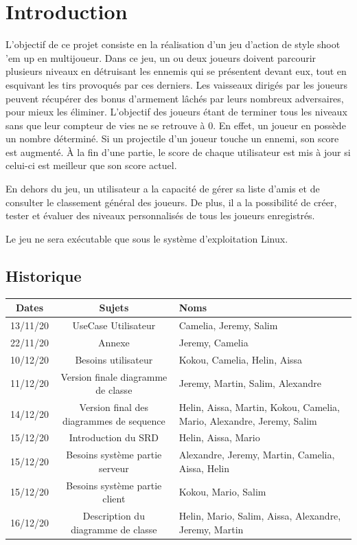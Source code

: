\documentclass[a4paper,12pt]{article}
\begin{document}
\newpage

\tableofcontents

\newpage


\section{Introduction}

L’objectif de ce projet consiste en la réalisation d'un jeu d'action de style shoot 'em up en multijoueur. Dans ce jeu, un ou deux joueurs doivent parcourir plusieurs niveaux en détruisant les ennemis qui se présentent devant eux, tout en esquivant les tirs provoqués par ces derniers. Les vaisseaux dirigés par les joueurs peuvent récupérer des bonus d’armement lâchés par leurs nombreux adversaires, pour mieux les éliminer. L'objectif des joueurs étant de terminer tous les niveaux sans que leur compteur de vies ne se retrouve à 0. En effet, un joueur en possède un nombre déterminé. Si un projectile d'un joueur touche un ennemi, son score est augmenté. À la fin d'une partie, le score de chaque utilisateur est mis à jour si celui-ci est meilleur que son score actuel.

En dehors du jeu, un utilisateur a la capacité de gérer sa liste d'amis et de consulter le classement général des joueurs. De plus, il a la possibilité de créer, tester et évaluer des niveaux personnalisés de tous les joueurs enregistrés.

Le jeu ne sera exécutable que sous le système d'exploitation Linux.

\subsection{Historique}
\begin{tabularx}{15cm}{|c|c|X|}
	\hline
		Dates & Sujets & Noms \\
	\hline
		13/11/20 & UseCase Utilisateur & Camelia, Jeremy, Salim \\
	\hline
		22/11/20 & Annexe & Jeremy, Camelia \\
	\hline
		10/12/20 & Besoins utilisateur & Kokou, Camelia, Helin, Aissa\\
	\hline
		11/12/20 & Version finale diagramme de classe  & Jeremy, Martin, Salim, Alexandre\\
	\hline
		14/12/20 & Version final des diagrammes de sequence & Helin, Aissa, Martin, Kokou, Camelia, 
		Mario, Alexandre, Jeremy, Salim\\
	\hline
		15/12/20 & Introduction du SRD & Helin, Aissa, Mario\\
	\hline
		15/12/20 & Besoins système partie serveur & Alexandre, Jeremy, Martin, Camelia, Aissa, Helin\\
	\hline
		15/12/20 & Besoins système partie client & Kokou, Mario, Salim\\
	\hline
		16/12/20 & Description du diagramme de classe & Helin, Mario, Salim, Aissa,
		Alexandre, Jeremy, Martin\\
	\hline
\end{tabularx}
\end{document}
